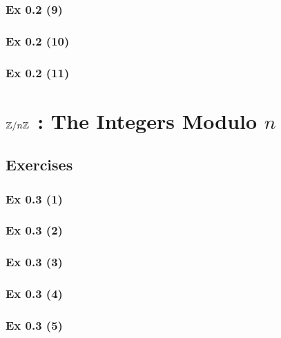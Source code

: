\subsubsection{Ex 0.2 (9)}\label{sec:Ex_0.2.9}

\subsubsection{Ex 0.2 (10)}\label{sec:Ex_0.2.10}

\subsubsection{Ex 0.2 (11)}\label{sec:Ex_0.2.11}

\newpage		%

\section{$\mathbb{Z} / n \mathbb{Z}$ : The Integers Modulo $n$}\label{sec:0.3}
\subsection*{Exercises}\label{sec:0.3_Exercises}	

\subsubsection{Ex 0.3 (1)}\label{sec:Ex_0.3.1}

\subsubsection{Ex 0.3 (2)}\label{sec:Ex_0.3.2}

\subsubsection{Ex 0.3 (3)}\label{sec:Ex_0.3.3}

\subsubsection{Ex 0.3 (4)}\label{sec:Ex_0.3.4}

\subsubsection{Ex 0.3 (5)}\label{sec:Ex_0.3.5}

